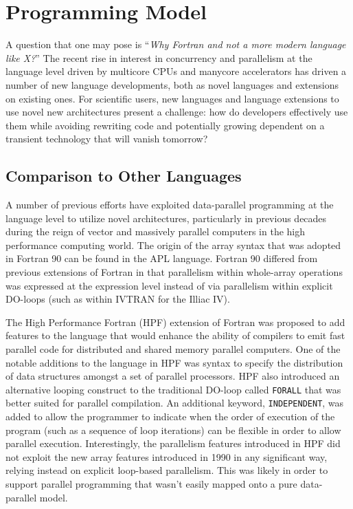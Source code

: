 \section{Programming Model}

A question that one may pose is ``\emph{Why Fortran and
  not a more modern language like X?}''  The recent rise in interest
in concurrency and parallelism at the language level driven by
multicore CPUs and manycore accelerators has driven a number of new
language developments, both as novel languages and extensions on
existing ones.  For scientific users, new languages and language
extensions to use novel new architectures present a challenge: how do
developers effectively use them while avoiding rewriting code
and potentially growing dependent on a transient technology that will
vanish tomorrow?

\subsection{Comparison to Other Languages}

A number of previous efforts have exploited data-parallel programming
at the language level to utilize novel architectures, particularly in
previous decades during the reign of vector and massively parallel
computers in the high performance computing world.  The origin of the
array syntax that was adopted in Fortran 90 can be found in the APL
language.  Fortran 90 differed from previous %
extensions of Fortran in that parallelism within whole-array
operations was expressed at the expression level instead of via
parallelism within explicit DO-loops (such as within IVTRAN for the
Illiac IV).

The High Performance Fortran (HPF) extension of Fortran was
proposed to add features to the language that would enhance the
ability of compilers to emit fast parallel code for distributed and
shared memory parallel computers\cite{koelbel94hpf}.  One of the
notable additions to the language in HPF was syntax to specify the
distribution of data structures amongst a set of parallel processors.
HPF also introduced an alternative looping construct to the
traditional DO-loop called {\tt FORALL} that was better suited for
parallel compilation.  An additional keyword, {\tt INDEPENDENT}, was
added to allow the programmer to indicate when the order of execution
of the program (such as a sequence of loop iterations) can be flexible
in order to allow parallel execution.  Interestingly, the parallelism
features introduced in HPF did not exploit the new array features
introduced in 1990 in any significant way, relying instead on explicit
loop-based parallelism.  This was likely in order to support parallel
programming that wasn't easily mapped onto a pure data-parallel model.

